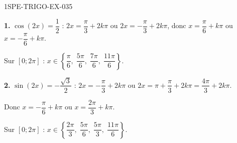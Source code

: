 \begin{corrige}{1SPE-TRIGO-EX-035}

\textbf{1.} $\cos(2x) = \dfrac{1}{2}$ : $2x = \dfrac{\pi}{3} + 2k\pi$ ou $2x = -\dfrac{\pi}{3} + 2k\pi$, donc $x = \dfrac{\pi}{6} + k\pi$ ou $x = -\dfrac{\pi}{6} + k\pi$.

Sur $[0;2\pi]$ : $x \in \left\{\dfrac{\pi}{6},\;\dfrac{5\pi}{6},\;\dfrac{7\pi}{6},\;\dfrac{11\pi}{6}\right\}$.

\textbf{2.} $\sin(2x) = -\dfrac{\sqrt{3}}{2}$ : $2x = -\dfrac{\pi}{3} + 2k\pi$ ou $2x = \pi + \dfrac{\pi}{3} + 2k\pi = \dfrac{4\pi}{3} + 2k\pi$.

Donc $x = -\dfrac{\pi}{6} + k\pi$ ou $x = \dfrac{2\pi}{3} + k\pi$.

Sur $[0;2\pi]$ : $x \in \left\{\dfrac{2\pi}{3},\;\dfrac{5\pi}{6},\;\dfrac{5\pi}{3},\;\dfrac{11\pi}{6}\right\}$.

\end{corrige}
